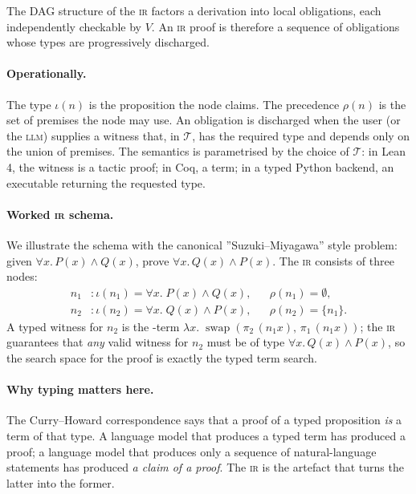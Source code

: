 \documentclass[11pt,a4paper]{article}
\newcommand{\LLM}{\textsc{llm}}
\newcommand{\IR}{\textsc{ir}}
\newcommand{\Coq}{Coq}
\newcommand{\LeanFour}{Lean\,4}
\newcommand{\IAnd}{\wedge}
\begin{document}
The DAG structure of the \IR{} factors a derivation into local
obligations, each independently checkable by $V$.  An \IR{} proof
is therefore a sequence of obligations whose types are progressively
discharged.

\paragraph{Operationally.}  The type $\iota(n)$ is the proposition
the node claims.  The precedence $\rho(n)$ is the set of premises
the node may use.  An obligation is discharged when the user (or
the \LLM{}) supplies a witness that, in $\mathcal{T}$, has the
required type and depends only on the union of premises.  The
semantics is parametrised by the choice of $\mathcal{T}$: in
\LeanFour{}, the witness is a tactic proof; in \Coq{}, a term; in a
typed Python backend, an executable returning the requested type.

\paragraph{Worked \IR{} schema.}  We illustrate the schema with the
canonical ''Suzuki--Miyagawa'' style problem: given
$\forall x.\, P(x) \IAnd Q(x)$, prove $\forall x.\, Q(x) \IAnd
P(x)$.  The \IR{} consists of three nodes:
\begin{align*}
  n_1 &: \iota(n_1) = \forall x.\; P(x) \IAnd Q(x),
        &&\rho(n_1) = \emptyset, \tag{hypothesis}\\
  n_2 &: \iota(n_2) = \forall x.\; Q(x) \IAnd P(x),
        &&\rho(n_2) = \{n_1\}. \tag{conclude}
\end{align*}
A typed witness for $n_2$ is the \Lambda-term
$\lambda x.\; \operatorname{swap}(\pi_2\, (n_1 x),\, \pi_1\,(n_1
x))$; the \IR{} guarantees that \emph{any} valid witness for $n_2$
must be of type
$\forall x.\, Q(x) \IAnd P(x)$, so the search space for the proof is
exactly the typed term search.

\paragraph{Why typing matters here.}
The Curry--Howard correspondence says that a proof of a typed
proposition \emph{is} a term of that type.  A language model that
produces a typed term has produced a proof; a language model that
produces only a sequence of natural-language statements has produced
\emph{a claim of a proof}.  The \IR{} is the artefact that turns the
latter into the former.
\end{document}
